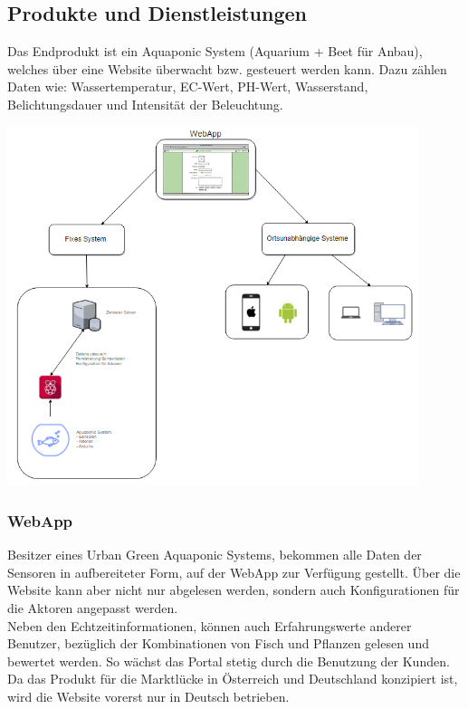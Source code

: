 \documentclass[11pt]{article}
\begin{document}
\subsection{Produkte und Dienstleistungen}
Das Endprodukt ist ein Aquaponic System (Aquarium + Beet f\"ur Anbau), welches \"uber eine Website \"uberwacht bzw. gesteuert werden kann. Dazu z\"ahlen Daten wie: Wassertemperatur, EC-Wert, PH-Wert, Wasserstand, Belichtungsdauer und Intensit\"at der Beleuchtung.
\begin{center}
	\includegraphics[width=12cm]{produkte}
\end{center}
\subsubsection{WebApp}
Besitzer eines Urban Green Aquaponic Systems, bekommen alle Daten der Sensoren in aufbereiteter Form, auf der WebApp zur Verf\"ugung gestellt. \"Uber die Website kann aber nicht nur abgelesen werden, sondern auch Konfigurationen f\"ur die Aktoren angepasst werden. \\
Neben den Echtzeitinformationen, k\"onnen auch Erfahrungswerte anderer Benutzer, bez\"uglich der Kombinationen von Fisch und Pflanzen gelesen und bewertet werden. So w\"achst das Portal stetig durch die Benutzung der Kunden. \\
Da das Produkt f\"ur die Marktl\"ucke in \"Osterreich und Deutschland konzipiert ist, wird die Website vorerst nur in Deutsch betrieben. 
\end{document}
